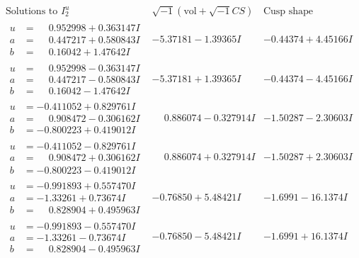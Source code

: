 \documentclass[1p]{elsarticle_modified}
\theoremstyle{definition}
\newcommand{\I}{\sqrt{-1}}
\begin{document}
$$\begin{array}{c|c|c}  
\text{Solutions to }I^u_{2}& \I (\text{vol} + \sqrt{-1}CS) & \text{Cusp shape}\\
 \hline 
\begin{aligned}
u &= \phantom{-}0.952998 + 0.363147 I \\
a &= \phantom{-}0.447217 + 0.580843 I \\
b &= \phantom{-}0.16042 + 1.47642 I\end{aligned}
 & -5.37181 - 1.39365 I & -0.44374 + 4.45166 I \\ \hline\begin{aligned}
u &= \phantom{-}0.952998 - 0.363147 I \\
a &= \phantom{-}0.447217 - 0.580843 I \\
b &= \phantom{-}0.16042 - 1.47642 I\end{aligned}
 & -5.37181 + 1.39365 I & -0.44374 - 4.45166 I \\ \hline\begin{aligned}
u &= -0.411052 + 0.829761 I \\
a &= \phantom{-}0.908472 - 0.306162 I \\
b &= -0.800223 + 0.419012 I\end{aligned}
 & \phantom{-}0.886074 - 0.327914 I & -1.50287 - 2.30603 I \\ \hline\begin{aligned}
u &= -0.411052 - 0.829761 I \\
a &= \phantom{-}0.908472 + 0.306162 I \\
b &= -0.800223 - 0.419012 I\end{aligned}
 & \phantom{-}0.886074 + 0.327914 I & -1.50287 + 2.30603 I \\ \hline\begin{aligned}
u &= -0.991893 + 0.557470 I \\
a &= -1.33261 + 0.73674 I \\
b &= \phantom{-}0.828904 + 0.495963 I\end{aligned}
 & -0.76850 + 5.48421 I & -1.6991 - 16.1374 I \\ \hline\begin{aligned}
u &= -0.991893 - 0.557470 I \\
a &= -1.33261 - 0.73674 I \\
b &= \phantom{-}0.828904 - 0.495963 I\end{aligned}
 & -0.76850 - 5.48421 I & -1.6991 + 16.1374 I \\ \hline\begin{aligned}

\end{aligned}
\end{array}$$
\end{document}
